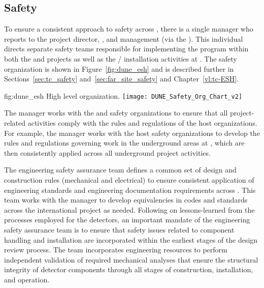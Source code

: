 \subsection{Safety}
\label{sec:dune_safety}

To ensure a consistent approach to safety across ,
there is a single   manager who reports 
to the  project director, , and 
management (via the  ).  This individual
directs separate safety teams responsible for implementing the
  program within both the  
and  projects as well as the /
installation activities at . The safety organization 
is shown in Figure~\ref{fig:dune_esh} and is described further in
Sections~\ref{sec:tc_safety} and~\ref{sec:far_site_safety} and
Chapter~\ref{vl:tc-ESH}.
\begin{dunefigure}{fig:dune_esh}
  {High level   organization.}
  \texttt{[image: DUNE\_Safety\_Org\_Chart\_v2]}
\end{dunefigure}
The   manager works with the  
and  safety organizations to ensure that all project-related 
activities comply with the rules and regulations of the host 
organizations.  For example, the   manager 
works with the host safety organizations to develop the rules and 
regulations governing work in the underground areas at , 
which are then consistently applied across all underground project 
activities.

The  engineering safety assurance team defines a common 
set of design and construction rules (mechanical and electrical) to 
ensure consistent application of engineering standards and engineering 
documentation requirements across .  This team works 
with the   manager to develop equivalencies 
in codes and standards across the international project as needed.  
Following on lessons-learned from the processes employed for the 
 detectors, an important mandate of the engineering 
safety assurance team is to ensure that safety issues related to 
component handling and installation are incorporated within the 
earliest stages of the design review process.  The  team 
incorporates engineering resources to perform independent validation 
of required mechanical analyses that ensure the structural integrity 
of detector components through all stages of construction, installation, 
and operation.

